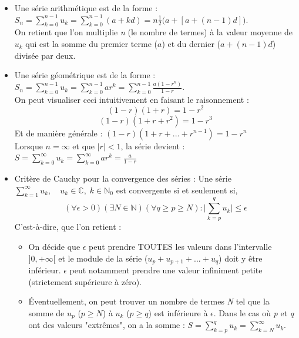 \documentclass[a4paper]{article}
\begin{document}
\newpage



















\begin{itemize}






\item Une série arithmétique est de la forme : $\displaystyle S_n = \sum_{k=0}^{n-1} u_k = \sum_{k=0}^{n-1} (a + k d) = n \frac{1}{2} \Big( a + [a + (n - 1) d ] \Big) $. \\ On retient que l'on multiplie \emph{n} (le nombre de termes) à la valeur moyenne de $ u_k $ qui est la somme du premier terme ($ a $) et du dernier ($ a + (n - 1) d $) divisée par deux.





\item Une série géométrique est de la forme : $\displaystyle S_n = \sum_{k=0}^{n-1} u_k = \sum_{k=0}^{n-1} a r^k = \sum_{k=0}^{n-1} \frac{a (1 - r^n)}{1 - r} $. \\ On peut visualiser ceci intuitivement en faisant le raisonnement : \[ (1 - r) (1 + r) = 1 - r^2 \]
\[ (1 - r) (1 + r + r^2) = 1 - r^3 \]
Et de manière générale : \quad $\displaystyle (1 - r) (1 + r + ... + r^{n-1}) = 1 - r^n $ \\
Lorsque $ n = \infty $ et que $ |r| < 1 $, la série devient : $\displaystyle S = \sum_{k=0}^{\infty} u_k = \sum_{k=0}^{\infty} a r^k = \frac{a}{1 - r} $





\item Critère de Cauchy pour la convergence des séries : Une série $\displaystyle \sum_{k=1}^{\infty} u_k, \quad u_k \in \mathbb{C}, \; k \in \mathbb{N}_0 $ est convergente si et seulement si, 
\[ (\forall \epsilon > 0) (\exists N \in \mathbb{N}) (\forall q \geq p \geq N) : \Bigg| \sum_{k=p}^{q} u_k \Bigg| \leq \epsilon \]
C'est-à-dire, que l'on retient : 
\begin{itemize}
\item On décide que $ \epsilon $ peut prendre TOUTES les valeurs dans l'intervalle $ ]0, + \infty[ $ et le module de la série ($ u_p + u_{p+1} + ... + u_q $) doit y être inférieur. $ \epsilon $ peut notamment prendre une valeur infiniment petite (strictement supérieure à zéro).
\item Éventuellement, on peut trouver un nombre de termes \emph{N} tel que la somme de $ u_p $ ($ p \geq N $) à $ u_k $ ($ p \geq q $) est inférieure à $ \epsilon $. Dans le cas où \emph{p} et \emph{q} ont des valeurs "extrêmes", on a la somme :  $\displaystyle S = \sum_{k=p}^{q} u_k = \sum_{k=N}^{\infty} u_k $.
\end{itemize}


\end{itemize}
\end{document}
